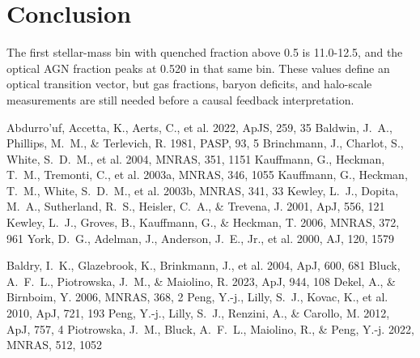 \documentclass[twocolumn]{aastex631}
\begin{document}
\section{Conclusion}\label{sec:conclusion}
The first stellar-mass bin with quenched fraction above 0.5 is 11.0-12.5, and the optical AGN fraction peaks at 0.520 in that same bin. These values define an optical transition vector, but gas fractions, baryon deficits, and halo-scale measurements are still needed before a causal feedback interpretation.


\begin{thebibliography}{}
 Abdurro'uf, Accetta, K., Aerts, C., et al. 2022, ApJS, 259, 35
 Baldwin, J.~A., Phillips, M.~M., \& Terlevich, R. 1981, PASP, 93, 5
 Brinchmann, J., Charlot, S., White, S.~D.~M., et al. 2004, MNRAS, 351, 1151
 Kauffmann, G., Heckman, T.~M., Tremonti, C., et al. 2003a, MNRAS, 346, 1055
 Kauffmann, G., Heckman, T.~M., White, S.~D.~M., et al. 2003b, MNRAS, 341, 33
 Kewley, L.~J., Dopita, M.~A., Sutherland, R.~S., Heisler, C.~A., \& Trevena, J. 2001, ApJ, 556, 121
 Kewley, L.~J., Groves, B., Kauffmann, G., \& Heckman, T. 2006, MNRAS, 372, 961
 York, D.~G., Adelman, J., Anderson, J.~E., Jr., et al. 2000, AJ, 120, 1579

 Baldry, I.~K., Glazebrook, K., Brinkmann, J., et al. 2004, ApJ, 600, 681
 Bluck, A.~F.~L., Piotrowska, J.~M., \& Maiolino, R. 2023, ApJ, 944, 108
 Dekel, A., \& Birnboim, Y. 2006, MNRAS, 368, 2
 Peng, Y.-j., Lilly, S.~J., Kovac, K., et al. 2010, ApJ, 721, 193
 Peng, Y.-j., Lilly, S.~J., Renzini, A., \& Carollo, M. 2012, ApJ, 757, 4
 Piotrowska, J.~M., Bluck, A.~F.~L., Maiolino, R., \& Peng, Y.-j. 2022, MNRAS, 512, 1052
\end{thebibliography}
\end{document}
